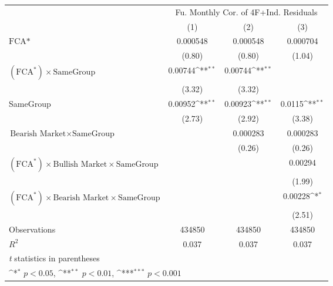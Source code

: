 {
\def\sym#1{\ifmmode^{#1}\else\(^{#1}\)\fi}
\begin{tabular}{l*{3}{c}}
\hline\hline
                &\multicolumn{3}{c}{Fu. Monthly Cor. of 4F+Ind. Residuals}\\\cmidrule(lr){2-4}
                &\multicolumn{1}{c}{(1)}         &\multicolumn{1}{c}{(2)}         &\multicolumn{1}{c}{(3)}         \\
\hline
$ \text{FCA*} $ & 0.000548         & 0.000548         & 0.000704         \\
                &   (0.80)         &   (0.80)         &   (1.04)         \\
[1em]
 $ (\text{FCA}^*) \times {\text{SameGroup} }  $ &  0.00744\sym{**} &  0.00744\sym{**} &                  \\
                &   (3.32)         &   (3.32)         &                  \\
[1em]
SameGroup       &  0.00952\sym{**} &  0.00923\sym{**} &   0.0115\sym{**} \\
                &   (2.73)         &   (2.92)         &   (3.38)         \\
[1em]
$ {\text{Bearish Market} } \times {\text{SameGroup} }  $ &                  & 0.000283         & 0.000283         \\
                &                  &   (0.26)         &   (0.26)         \\
[1em]
$ (\text{FCA}^*) \times {\text{Bullish Market}} \times {\text{SameGroup} }  $ &                  &                  &  0.00294         \\
                &                  &                  &   (1.99)         \\
[1em]
$ (\text{FCA}^*) \times {\text{Bearish Market}} \times {\text{SameGroup} }  $ &                  &                  &  0.00228\sym{*}  \\
                &                  &                  &   (2.51)         \\
\hline
Observations    &   434850         &   434850         &   434850         \\
\(R^{2}\)       &    0.037         &    0.037         &    0.037         \\
\hline\hline
\multicolumn{4}{l}{\footnotesize \textit{t} statistics in parentheses}\\
\multicolumn{4}{l}{\footnotesize \sym{*} \(p<0.05\), \sym{**} \(p<0.01\), \sym{***} \(p<0.001\)}\\
\end{tabular}
}

